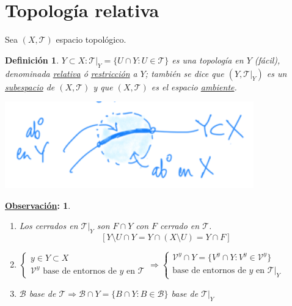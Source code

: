 \documentclass[10pt,a4paper,openright]{book}
\theoremstyle{break}
\newtheorem*{defi}{Definición}
\newtheorem*{obs}{\underline{Observación}:}
\begin{document}
\section{Topología relativa}%
\label{sec:topologia_relativa}
Sea $\left( X, \mathcal{T} \right)$ espacio topológico.
\begin{defi}
$Y \subset X: \mathcal{T}|_Y = \{U \cap Y: U \in \mathcal{T}\}$ es una topología en $Y$ (fácil), denominada \underline{relativa} ó \underline{restricción} a $Y$; también se dice que $\left( Y, \mathcal{T}|_Y \right)$ es un \underline{subespacio} de $\left( X, \mathcal{T} \right)$ y que $\left( X, \mathcal{T} \right)$ es el espacio \underline{ambiente}. 
\begin{center}
    \includegraphics[scale=0.3]{images/def_subespacio_top} 
\end{center}
\end{defi}

\begin{obs}
\begin{enumerate}
    \item Los cerrados en $\mathcal{T}|_Y$ son $F\cap Y$ con $F$ cerrado en $\mathcal{T}$.
    \[
    \left[ Y \setminus U \cap Y = Y \cap \left( X \setminus U \right) = Y\cap F \right] 
    \]
    \item 
    $\begin{cases}
        y \in Y \subset X\\
        \mathcal{V}^y \text{ base de entornos de } y \text{ en } \mathcal{T} 
    \end{cases}\Rightarrow \begin{cases}
        \mathcal{V}^y \cap Y = \{V^y \cap Y : V^y \in \mathcal{V}^y\} \\
        \text{base de entornos de } y \text{ en } \mathcal{T}|_Y 
    \end{cases}$

    \item $\mathcal{B}$ base de $\mathcal{T} \Rightarrow \mathcal{B} \cap Y = \{B \cap Y : B \in \mathcal{B}\}$ base de $\mathcal{T}|_Y$
\end{enumerate}
\end{obs}
\end{document}
